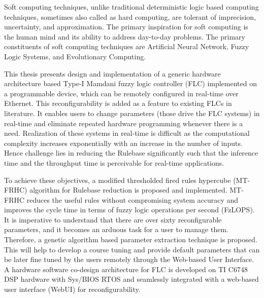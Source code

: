 


\begin{abstracts}        %
	
	Soft computing techniques, unlike traditional deterministic logic based computing techniques, sometimes also called as hard computing, are tolerant of imprecision, uncertainty, and approximation. The primary inspiration for soft computing is the human mind and its ability to address day-to-day problems. The primary constituents of soft computing techniques are Artificial Neural Network, Fuzzy Logic Systems, and Evolutionary Computing.
	
	This thesis presents design and implementation of a generic hardware architecture based Type-I Mamdani fuzzy logic controller (FLC) implemented on a programmable device, which can be remotely configured in real-time over Ethernet. This reconfigurability is added as a feature to existing FLCs in literature. It enables users to change parameters (those drive the FLC systems) in real-time and eliminate repeated hardware programming whenever there is a need. Realization of these systems in real-time is  difficult as the computational complexity increases exponentially with an increase in the number of inputs. Hence challenge lies in reducing the Rulebase significantly such that the inference time and the throughput time is perceivable for real-time applications.
	
	To achieve these objectives, a modified thresholded fired rules hypercube (MT-FRHC) algorithm for Rulebase reduction is proposed and implemented. MT-FRHC reduces the useful rules without compromising system accuracy and improves the cycle time in terms of fuzzy logic operations per second (FzLOPS). It is imperative to understand that there are over sixty reconfigurable parameters, and it becomes an arduous task for a user to manage them. Therefore, a genetic algorithm based parameter extraction technique is proposed. This will help to develop a course tuning and provide default parameters that can be later fine tuned by the users remotely through the Web-based User Interface. A hardware software co-design architecture for FLC is developed on TI C6748 DSP hardware with Sys/BIOS RTOS and seamlessly integrated with a web-based user interface (WebUI) for reconfigurability.
	

\end{abstracts}
